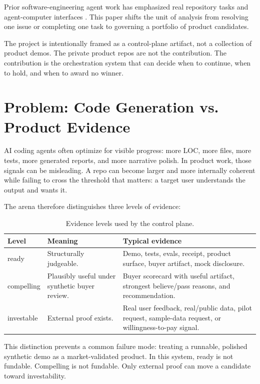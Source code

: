 \documentclass[11pt]{article}
\begin{document}
Prior software-engineering agent work has emphasized real repository tasks and agent-computer interfaces \cite{jimenez2024swebench,yang2024sweagent}. This paper shifts the unit of analysis from resolving one issue or completing one task to governing a portfolio of product candidates.

The project is intentionally framed as a control-plane artifact, not a collection of product demos. The private product repos are not the contribution. The contribution is the orchestration system that can decide when to continue, when to hold, and when to award no winner.

\section{Problem: Code Generation vs. Product Evidence}

AI coding agents often optimize for visible progress: more LOC, more files, more tests, more generated reports, and more narrative polish. In product work, those signals can be misleading. A repo can become larger and more internally coherent while failing to cross the threshold that matters: a target user understands the output and wants it.

The arena therefore distinguishes three levels of evidence:

\begin{table}[!htbp]
\centering
\begin{tabularx}{\linewidth}{>{\ttfamily}l Y Y}
\toprule
Level & Meaning & Typical evidence \\
\midrule
ready & Structurally judgeable. & Demo, tests, evals, receipt, product surface, buyer artifact, mock disclosure. \\
compelling & Plausibly useful under synthetic buyer review. & Buyer scorecard with useful artifact, strongest believe/pass reasons, and recommendation. \\
investable & External proof exists. & Real user feedback, real/public data, pilot request, sample-data request, or willingness-to-pay signal. \\
\bottomrule
\end{tabularx}
\caption{Evidence levels used by the control plane.}
\end{table}

This distinction prevents a common failure mode: treating a runnable, polished synthetic demo as a market-validated product. In this system, ready is not fundable. Compelling is not fundable. Only external proof can move a candidate toward investability.
\end{document}
